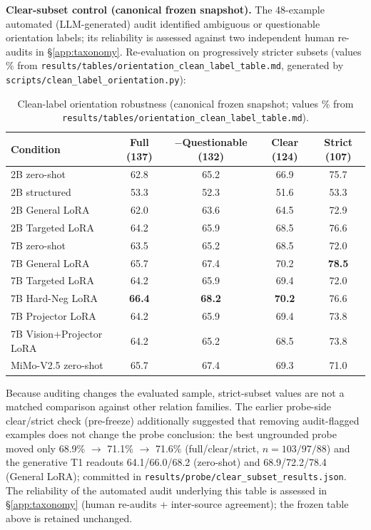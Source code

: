 \textbf{Clear-subset control (canonical frozen snapshot).}
The 48-example automated (LLM-generated) audit identified ambiguous or
questionable orientation labels; its reliability is assessed against two
independent human re-audits in \S\ref{app:taxonomy}. Re-evaluation on
progressively stricter subsets (values \% from
\texttt{results/tables/orientation\_clean\_label\_table.md}, generated by
\texttt{scripts/clean\_label\_orientation.py}):
\begin{table}[h]
\centering
\footnotesize
\caption{Clean-label orientation robustness (canonical frozen snapshot;
values \% from
\texttt{results/tables/orientation\_clean\_label\_table.md}).}
\label{tab:cleanlabel}
\begin{tabular}{lcccc}
\toprule
Condition & Full (137) & $-$Questionable (132) & Clear (124) & Strict (107) \\
\midrule
2B zero-shot & 62.8 & 65.2 & 66.9 & 75.7 \\
2B structured & 53.3 & 52.3 & 51.6 & 53.3 \\
2B General LoRA & 62.0 & 63.6 & 64.5 & 72.9 \\
2B Targeted LoRA & 64.2 & 65.9 & 68.5 & 76.6 \\
7B zero-shot & 63.5 & 65.2 & 68.5 & 72.0 \\
7B General LoRA & 65.7 & 67.4 & 70.2 & \textbf{78.5} \\
7B Targeted LoRA & 64.2 & 65.9 & 69.4 & 72.0 \\
7B Hard-Neg LoRA & \textbf{66.4} & \textbf{68.2} & \textbf{70.2} & 76.6 \\
7B Projector LoRA & 64.2 & 65.9 & 69.4 & 73.8 \\
7B Vision+Projector LoRA & 64.2 & 65.2 & 68.5 & 73.8 \\
MiMo-V2.5 zero-shot & 65.7 & 67.4 & 69.3 & 71.0 \\
\bottomrule
\end{tabular}
\end{table}
Because auditing changes the evaluated sample, strict-subset values are not a
matched comparison against other relation families. The earlier probe-side
clear/strict check (pre-freeze) additionally suggested that removing
audit-flagged examples does not change the probe conclusion: the best
ungrounded probe moved only
68.9\% $\rightarrow$ 71.1\% $\rightarrow$ 71.6\% (full/clear/strict,
$n=103/97/88$) and the generative T1 readouts 64.1/66.0/68.2 (zero-shot) and
68.9/72.2/78.4 (General LoRA); committed in
\texttt{results/probe/clear\_subset\_results.json}.
The reliability of the automated audit underlying this table is assessed in
\S\ref{app:taxonomy} (human re-audits + inter-source agreement); the frozen
table above is retained unchanged.

